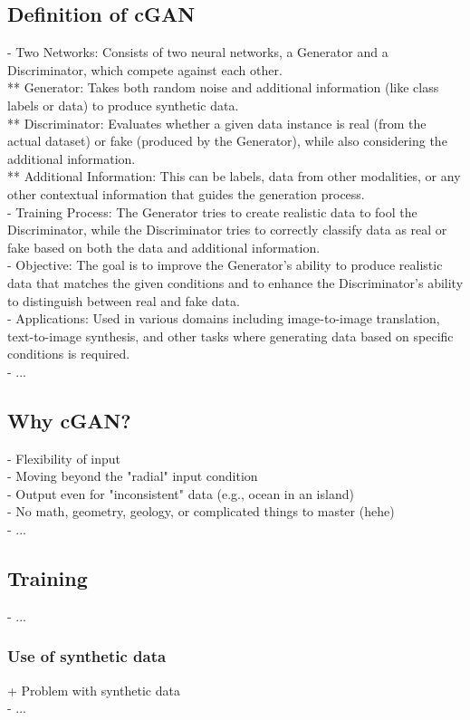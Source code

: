 \subsection{Definition of cGAN}
- Two Networks: Consists of two neural networks, a Generator and a Discriminator, which compete against each other. \\
** Generator: Takes both random noise and additional information (like class labels or data) to produce synthetic data. \\
** Discriminator: Evaluates whether a given data instance is real (from the actual dataset) or fake (produced by the Generator), while also considering the additional information. \\
** Additional Information: This can be labels, data from other modalities, or any other contextual information that guides the generation process. \\
- Training Process: The Generator tries to create realistic data to fool the Discriminator, while the Discriminator tries to correctly classify data as real or fake based on both the data and additional information. \\
- Objective: The goal is to improve the Generator’s ability to produce realistic data that matches the given conditions and to enhance the Discriminator’s ability to distinguish between real and fake data. \\
- Applications: Used in various domains including image-to-image translation, text-to-image synthesis, and other tasks where generating data based on specific conditions is required. \\
- ...

\subsection{Why cGAN?}
- Flexibility of input \\
- Moving beyond the "radial" input condition \\
- Output even for "inconsistent" data (e.g., ocean in an island) \\
- No math, geometry, geology, or complicated things to master (hehe) \\
- ... 

\subsection{Training}
- ...

\subsubsection{Use of synthetic data}
+ Problem with synthetic data \\
- ...

